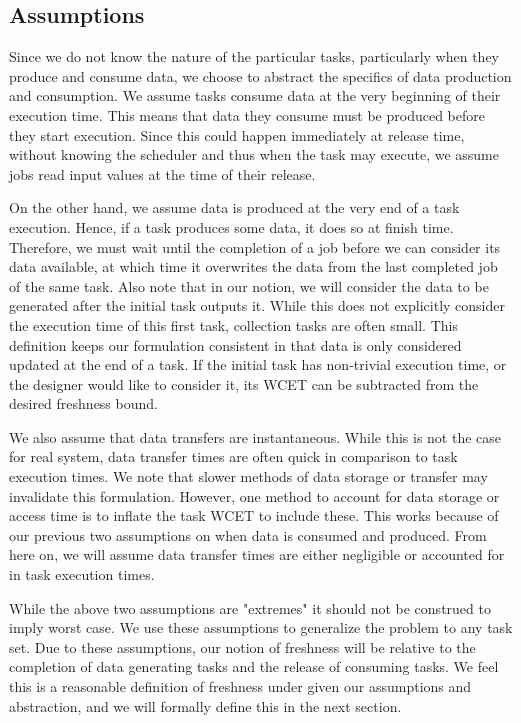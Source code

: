 \subsection{Assumptions}

Since we do not know the nature of the particular tasks, particularly when they produce and consume data, we choose to abstract the specifics of data production and consumption. We assume tasks consume data at the very beginning of their execution time. This means that data they consume must be produced before they start execution. Since this could happen immediately at release time, without knowing the scheduler and thus when the task may execute, we assume jobs read input values at the time of their release.

On the other hand, we assume data is produced at the very end of a task execution. Hence, if a task produces some data, it does so at finish time. Therefore, we must wait until the completion of a job before we can consider its data available, at which time it overwrites the data from the last completed job of the same task. Also note that in our notion, we will consider the data to be generated after the initial task outputs it. While this does not explicitly consider the execution time of this first task, collection tasks are often small. This definition keeps our formulation consistent in that data is only considered updated at the end of a task. If the initial task has non-trivial execution time, or the designer would like to consider it, its WCET can be subtracted from the desired freshness bound.

We also assume that data transfers are instantaneous. While this is not the case for real system, data transfer times are often quick in comparison to task execution times. We note that slower methods of data storage or transfer may invalidate this formulation. However, one method to account for data storage or access time is to inflate the task WCET to include these. This works because of our previous two assumptions on when data is consumed and produced. From here on, we will assume data transfer times are either negligible or accounted for in task execution times.

While the above two assumptions are "extremes" it should not be construed to imply worst case. We use these assumptions to generalize the problem to any task set. Due to these assumptions, our notion of freshness will be relative to the completion of data generating tasks and the release of consuming tasks. We feel this is a reasonable definition of freshness under given our assumptions and abstraction, and we will formally define this in the next section.


